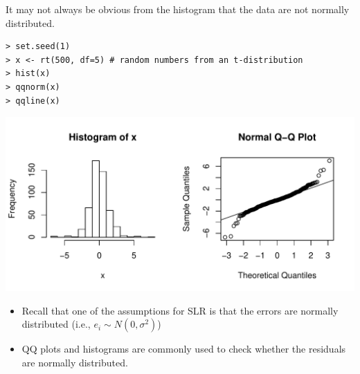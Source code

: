 \documentclass[10pt]{beamer}
\begin{document}
\begin{frame}[fragile]
It may not always be obvious from the histogram that the data are not normally distributed.
\small
\begin{verbatim}
> set.seed(1)
> x <- rt(500, df=5) # random numbers from an t-distribution
> hist(x)
> qqnorm(x)
> qqline(x)
\end{verbatim}
\begin{center}
\includegraphics[scale=0.55]{figure/qqt1.pdf}
\end{center}
\end{frame}

\begin{frame}
\begin{itemize}
\item Recall that one of the assumptions for SLR is that the errors are normally distributed (i.e., $e_i \sim N(0, \sigma^2)$)
\vspace{10pt}
\item QQ plots and histograms are commonly used to check whether the residuals are normally distributed.  
\end{itemize}
\end{frame}
\end{document}
